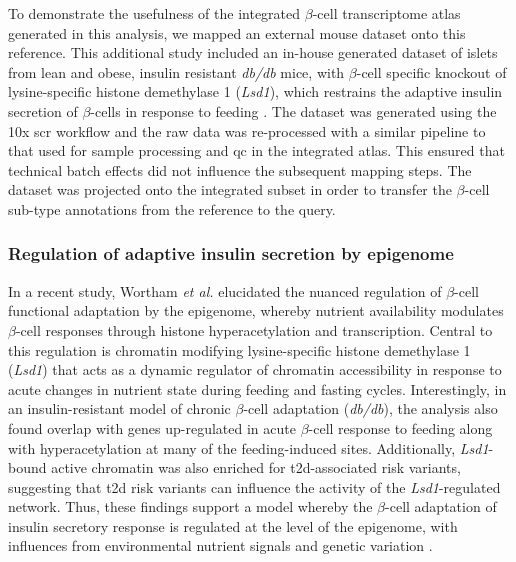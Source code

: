 \par To demonstrate the usefulness of the integrated $\beta$-cell transcriptome atlas generated in this analysis, we mapped an external mouse dataset onto this reference. This additional study included an in-house generated dataset of islets from lean and obese, insulin resistant \textit{db/db} mice, with $\beta$-cell specific knockout of lysine-specific histone demethylase 1 (\textit{Lsd1}), which restrains the adaptive insulin secretion of $\beta$-cells in response to feeding \textbf{\cite{wortham_nutrient_2023}}. The dataset was generated using the 10x \gls{scr} workflow and the raw data was re-processed with a similar pipeline to that used for sample processing and \gls{qc} in the integrated atlas. This ensured that technical batch effects did not influence the subsequent mapping steps. The dataset was projected onto the integrated subset in order to transfer the $\beta$-cell sub-type annotations from the reference to the query.

\subsubsection{\large Regulation of adaptive insulin secretion by epigenome}

In a recent study, Wortham \textit{et al.} elucidated the nuanced regulation of $\beta$-cell functional adaptation by the epigenome, whereby nutrient availability modulates $\beta$-cell responses through histone hyperacetylation and transcription. Central to this regulation is chromatin modifying lysine-specific histone demethylase 1 (\textit{Lsd1}) that acts as a dynamic regulator of chromatin accessibility in response to acute changes in nutrient state during feeding and fasting cycles. Interestingly, in an insulin-resistant model of chronic $\beta$-cell adaptation (\textit{db/db}), the analysis also found overlap with genes up-regulated in acute $\beta$-cell response to feeding along with hyperacetylation at many of the feeding-induced sites. Additionally, \textit{Lsd1}-bound active chromatin was also enriched for \gls{t2d}-associated risk variants, suggesting that \gls{t2d} risk variants can influence the activity of the \textit{Lsd1}-regulated network. Thus, these findings support a model whereby the $\beta$-cell adaptation of insulin secretory response is regulated at the level of the epigenome, with influences from environmental nutrient signals and genetic variation \textbf{\cite{wortham_nutrient_2023,aamodt_peeling_2023}}.


